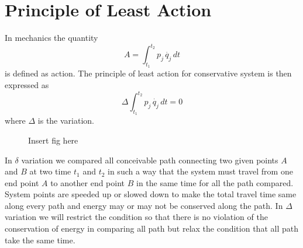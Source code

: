 \documentclass[12pt]{article}
\begin{document}
\section{Principle of Least Action}
In mechanics the quantity
\[A=\int_{t_1}^{t_2}p_j\,\dot{q_j}\,dt \]
is defined as action. The principle of least action for conservative system is then expressed as 
\[\Delta \int_{t_1}^{t_2}p_j\,\dot{q_j}\,dt=0 \]
where \(\Delta\) is the variation.\\
\begin{figure}[H]
    \centering
    Insert fig here
\end{figure}
In \(\delta\) variation we compared all conceivable path connecting two given points \(A\) and \(B\) at two time \(t_1\) and \(t_2\) in such a way that the system must travel from one end point \(A\) to another end point \(B\) in the same time for all the path compared. System points are speeded up or slowed down to make the total travel time same along every path and energy may or may not be conserved along the path. In \(\Delta\) variation we will restrict the condition so that there is no violation of the conservation of energy in comparing all path but relax the condition that all path take the same time.
\end{document}
